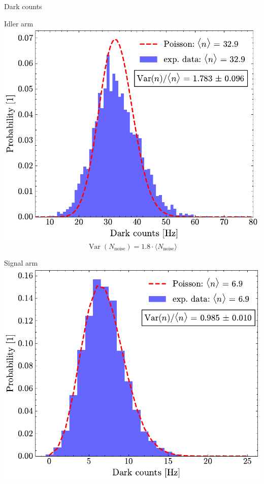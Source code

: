 \documentclass[10pt,aspectratio=43]{beamer}
\begin{document}
	\begin{frame}{Dark counts}
		\begin{minipage}{.45\textwidth}
			\centering
			Idler arm
			{\vspace*{4em}}
			\includegraphics[width=\textwidth]{Images/DC_Idl_2.pdf}
			\vspace*{-4em}
			\begin{equation*}
				\operatorname{Var}\!\left(N_{\text{noise}}\right) = 1.8 \cdot \langle N_{\text{noise}} \rangle
			\end{equation*}
		\end{minipage}
		\hfill
		\begin{minipage}{.45\textwidth}
			\centering
			Signal arm
			\vspace{2em}
			\includegraphics[width=\textwidth]{Images/DC_Sig_2.pdf}
		\end{minipage}
	\end{frame}
	
\end{document}
